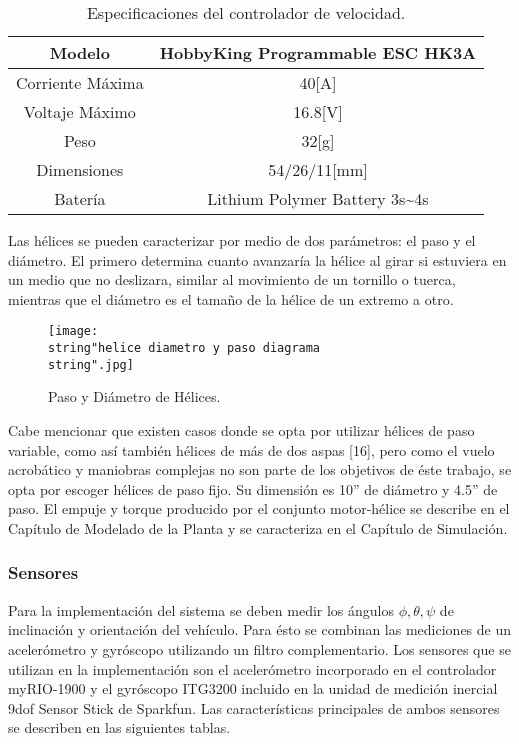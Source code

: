 \documentclass[\main/main.tex]{subfiles}
\begin{document}
\begin{table}[H]
\noindent \begin{centering}
\begin{tabular}{|c|c|}
\hline 
\multicolumn{1}{|c}{Modelo } & HobbyKing Programmable ESC HK3A\tabularnewline
\hline 
\hline 
Corriente Máxima & 40{[}A{]}\tabularnewline
\hline 
Voltaje Máximo & 16.8{[}V{]}\tabularnewline
\hline 
Peso & 32{[}g{]}\tabularnewline
\hline 
Dimensiones & 54/26/11{[}mm{]}\tabularnewline
\hline 
Batería & Lithium Polymer Battery 3s\textasciitilde{}4s\tabularnewline
\hline 
\end{tabular}
\par\end{centering}
\caption{Especificaciones del controlador de velocidad.}
\end{table}

\textcompwordmark{}

Las hélices se pueden caracterizar por medio de dos parámetros: el
paso y el diámetro. El primero determina cuanto avanzaría la hélice
al girar si estuviera en un medio que no deslizara, similar al movimiento
de un tornillo o tuerca, mientras que el diámetro es el tamaño de
la hélice de un extremo a otro. 

\begin{figure}[H]
\noindent \begin{centering}
\texttt{[image: \\string"helice diametro y paso diagrama\\string".jpg]}
\par\end{centering}
\caption{Paso y Diámetro de Hélices.}
\end{figure}

Cabe mencionar que existen casos donde se opta por utilizar hélices
de paso variable, como así también hélices de más de
dos aspas [16], pero como el vuelo acrobático y maniobras
complejas no son parte de los objetivos de éste trabajo, se opta por
escoger hélices de paso fijo. Su dimensión es 10'' de diámetro y 4.5'' de paso. 
El empuje y torque producido por el conjunto motor-hélice se describe en el Capítulo de Modelado de la Planta y se caracteriza en el Capítulo de Simulación.


\subsubsection{Sensores}

Para la implementación del sistema se deben medir los ángulos $ \phi, \theta, \psi $ de inclinación
y orientación del vehículo. Para ésto se combinan las mediciones de
un acelerómetro y gyróscopo utilizando un filtro complementario. Los
sensores que se utilizan en la implementación son el acelerómetro
incorporado en el controlador myRIO-1900 y el gyróscopo ITG3200 incluido
en la unidad de medición inercial 9dof Sensor Stick de Sparkfun. Las
características principales de ambos sensores se describen en las
siguientes tablas.
\end{document}
